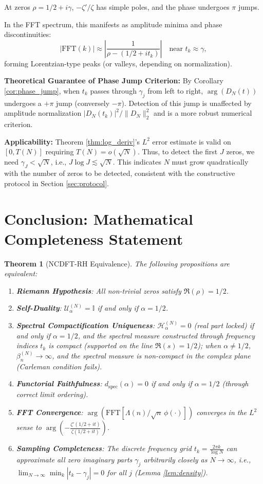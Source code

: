 \documentclass[12pt,a4paper]{amsart}
\theoremstyle{plain}
\newtheorem{theorem}{Theorem}[section]
\theoremstyle{definition}
\theoremstyle{remark}
\begin{document}
At zeros $\rho = 1/2 + i\gamma$, $-\zeta'/\zeta$ has simple poles, and the phase undergoes $\pi$ jumps.

In the FFT spectrum, this manifests as amplitude minima and phase discontinuities:
\begin{equation}
|\mathrm{FFT}(k)| \approx \left| \frac{1}{\rho - (1/2+it_k)} \right| \quad \text{near } t_k \approx \gamma,
\end{equation}
forming Lorentzian-type peaks (or valleys, depending on normalization).

\textbf{Theoretical Guarantee of Phase Jump Criterion:}
By Corollary \ref{cor:phase_jump}, when $t_k$ passes through $\gamma_j$ from left to right, $\arg(D_N(t))$ undergoes a $+\pi$ jump (conversely $-\pi$). Detection of this jump is unaffected by amplitude normalization $|D_N(t_k)|^2/\|D_N\|_2^2$ and is a more robust numerical criterion.

\textbf{Applicability:} Theorem \ref{thm:log_deriv}'s $L^2$ error estimate is valid on $[0, T(N)]$ requiring $T(N) = o(\sqrt{N})$. Thus, to detect the first $J$ zeros, we need $\gamma_J < \sqrt{N}$, i.e., $J \log J \lesssim \sqrt{N}$. This indicates $N$ must grow quadratically with the number of zeros to be detected, consistent with the constructive protocol in Section \ref{sec:protocol}.

\section{Conclusion: Mathematical Completeness Statement}

\begin{theorem}[NCDFT-RH Equivalence]\label{thm:main}
The following propositions are equivalent:
\begin{enumerate}
    \item \textbf{Riemann Hypothesis}: All non-trivial zeros satisfy $\Re(\rho)=1/2$.
    \item \textbf{Self-Duality}: $\mathcal{U}_\alpha^{(N)}=\mathbb{I}$ if and only if $\alpha=1/2$.
    \item \textbf{Spectral Compactification Uniqueness}: $\mathcal{H}_\alpha^{(N)}=0$ (real part locked) if and only if $\alpha=1/2$, and the spectral measure constructed through frequency indices $t_k$ is compact (supported on the line $\Re(s)=1/2$); when $\alpha\neq1/2$, $\beta_n^{(N)}\to\infty$, and the spectral measure is non-compact in the complex plane (Carleman condition fails).
    \item \textbf{Functorial Faithfulness}: $d_{\mathrm{spec}}(\alpha)=0$ if and only if $\alpha=1/2$ (through correct limit ordering).
    \item \textbf{FFT Convergence}: $\arg(\mathrm{FFT}[\Lambda(n)/\sqrt{n}\,\phi(\cdot)])$ converges in the $L^2$ sense to $\arg\left(-\frac{\zeta'(1/2+it)}{\zeta(1/2+it)}\right)$.
    \item \textbf{Sampling Completeness}: The discrete frequency grid $t_k = \frac{2\pi k}{\log N}$ can approximate all zero imaginary parts $\gamma_j$ arbitrarily closely as $N\to\infty$, i.e., $\lim_{N\to\infty} \min_k |t_k - \gamma_j| = 0$ for all $j$ (Lemma \ref{lem:density}).
\end{enumerate}
\end{theorem}
\end{document}
